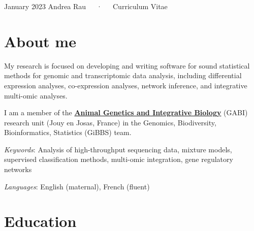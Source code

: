 \documentclass[11pt, a4paper]{awesome-cv}
\begin{document}
\makecvheader

\makecvfooter
  {January 2023}
    {Andrea Rau~~~·~~~Curriculum Vitae}
  {\thepage}





\hypertarget{about-me}{%
\section{About me}\label{about-me}}

My research is focused on developing and writing software for sound
statistical methods for genomic and transcriptomic data analysis,
including differential expression analyses, co-expression analyses,
network inference, and integrative multi-omic analyses.

I am a member of the
\href{https://www6.jouy.inra.fr/gabi_eng/}{\textbf{Animal Genetics and
Integrative Biology}} (GABI) research unit (Jouy en Josas, France) in
the Genomics, Biodiversity, Bioinformatics, Statistics (GiBBS) team.

\emph{Keywords}: Analysis of high-throughput sequencing data, mixture
models, supervised classification methods, multi-omic integration, gene
regulatory networks

\emph{Languages}: English (maternal), French (fluent)

\hypertarget{education}{%
\section{Education}\label{education}}
\end{document}

